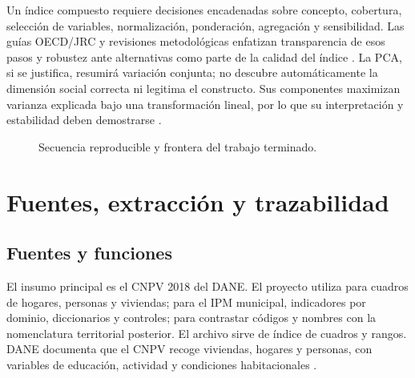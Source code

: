 \documentclass[11pt,a4paper]{article}
\begin{document}
Un índice compuesto requiere decisiones encadenadas sobre concepto, cobertura, selección de variables, normalización, ponderación, agregación y sensibilidad. Las guías OECD/JRC y revisiones metodológicas enfatizan transparencia de esos pasos y robustez ante alternativas como parte de la calidad del índice \citep{oecd_jrc_2008,booysen2002composite,decancq_lugo_2013,greco2019composite}. La PCA, si se justifica, resumirá variación conjunta; no descubre automáticamente la dimensión social correcta ni legitima el constructo. Sus componentes maximizan varianza explicada bajo una transformación lineal, por lo que su interpretación y estabilidad deben demostrarse \citep{jolliffe_2002,abdi_williams_2010}.

\begin{figure}[htbp]
\centering
{}
\caption{Secuencia reproducible y frontera del trabajo terminado.}
\label{fig:flujo}
\end{figure}

\section{Fuentes, extracción y trazabilidad}

\subsection{Fuentes y funciones}

El insumo principal es el CNPV 2018 del DANE. El proyecto utiliza  para cuadros de hogares, personas y viviendas;  para el IPM municipal, indicadores por dominio, diccionarios y controles;  para contrastar códigos y nombres con la nomenclatura territorial posterior. El archivo  sirve de índice de cuadros y rangos. DANE documenta que el CNPV recoge viviendas, hogares y personas, con variables de educación, actividad y condiciones habitacionales \citep{dane_cnpv_2018}.
\end{document}
